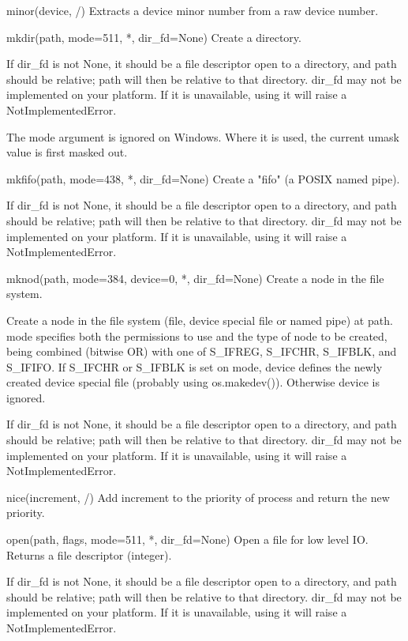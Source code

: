 \documentclass{article}
\begin{document}
    minor(device, /)
        Extracts a device minor number from a raw device number.

    mkdir(path, mode=511, *, dir_fd=None)
        Create a directory.

        If dir_fd is not None, it should be a file descriptor open to a directory,
          and path should be relative; path will then be relative to that directory.
        dir_fd may not be implemented on your platform.
          If it is unavailable, using it will raise a NotImplementedError.

        The mode argument is ignored on Windows. Where it is used, the current umask
        value is first masked out.

    mkfifo(path, mode=438, *, dir_fd=None)
        Create a "fifo" (a POSIX named pipe).

        If dir_fd is not None, it should be a file descriptor open to a directory,
          and path should be relative; path will then be relative to that directory.
        dir_fd may not be implemented on your platform.
          If it is unavailable, using it will raise a NotImplementedError.

    mknod(path, mode=384, device=0, *, dir_fd=None)
        Create a node in the file system.

        Create a node in the file system (file, device special file or named pipe)
        at path.  mode specifies both the permissions to use and the
        type of node to be created, being combined (bitwise OR) with one of
        S_IFREG, S_IFCHR, S_IFBLK, and S_IFIFO.  If S_IFCHR or S_IFBLK is set on mode,
        device defines the newly created device special file (probably using
        os.makedev()).  Otherwise device is ignored.

        If dir_fd is not None, it should be a file descriptor open to a directory,
          and path should be relative; path will then be relative to that directory.
        dir_fd may not be implemented on your platform.
          If it is unavailable, using it will raise a NotImplementedError.

    nice(increment, /)
        Add increment to the priority of process and return the new priority.

    open(path, flags, mode=511, *, dir_fd=None)
        Open a file for low level IO.  Returns a file descriptor (integer).

        If dir_fd is not None, it should be a file descriptor open to a directory,
          and path should be relative; path will then be relative to that directory.
        dir_fd may not be implemented on your platform.
          If it is unavailable, using it will raise a NotImplementedError.
\end{document}
